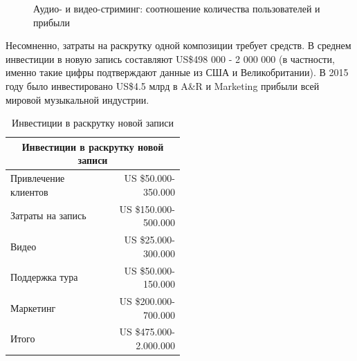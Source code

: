\documentclass[12pt]{report}
\begin{document}
\begin{figure}[h]
\centering
\caption{Аудио- и видео-стриминг: соотношение количества пользователей и прибыли}
\vspace{20pt}
\userRevenue
{}
\end{figure}	

Несомненно, затраты на раскрутку одной композиции требует средств.
В среднем инвестиции в новую запись составляют US\$498 000 - 2 000 000 (в частности, именно такие цифры подтверждают данные из США и Великобритании). В 2015 году  было инвестировано US\$4.5 млрд в A\&R и Marketing прибыли всей мировой музыкальной индустрии.

\def\InvestToRecord{Инвестиции в раскрутку новой записи}
\def\Clients{Привлечение клиентов}
\def\Record{Затраты на запись}
\def\Video{Видео}
\def\Tour{Поддержка тура}
\def\Marketing{Маркетинг}
\def\Sum{Итого}

\begin{table}[h]
\centering
\caption{Инвестиции в раскрутку новой записи}
\begin{tabular}{p{0.5\linewidth}r}
\toprule
\multicolumn{2}{c}{\InvestToRecord} \\
\bottomrule
\midrule
\Clients					& US \$50.000-350.000 \\
\Record					& US \$150.000-500.000 \\
\Video					& US \$25.000-300.000 \\
\Tour					& US \$50.000-150.000 \\
\Marketing			& US \$200.000-700.000 \\
\Sum 					& US \$475.000-2.000.000 \\
\bottomrule
\end{tabular}
\end{table}
\end{document}

